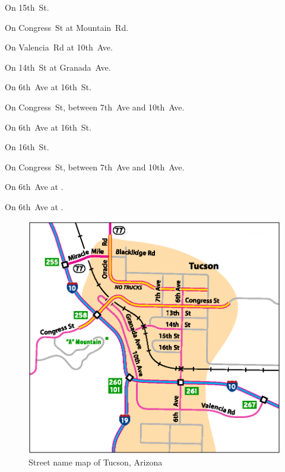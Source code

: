 \pagebreak[3]

\begin{LocationList}

On 15th~St.

On Congress~St at  Mountain~Rd.

On Valencia~Rd at 10th~Ave.

On 14th~St at Granada~Ave.

On 6th~Ave at 16th~St.

\Location{\GarageHQ \Garage}
On Congress~St, between 7th~Ave and 10th~Ave.

\Location{\GasStation \Gas}
On 6th~Ave at 16th~St.

On 16th~St.

\Location{\RecruitmentAgency \Recruitment}
On Congress~St, between 7th~Ave and 10th~Ave.

On 6th~Ave at  .

On 6th~Ave at  .

\end{LocationList}

\begin{figure}[hp]
\includegraphics[scale=0.88]{cities/arizona/tucson}
\centering\caption{Street name map of Tucson, Arizona}
\end{figure}
\pagebreak[4]
